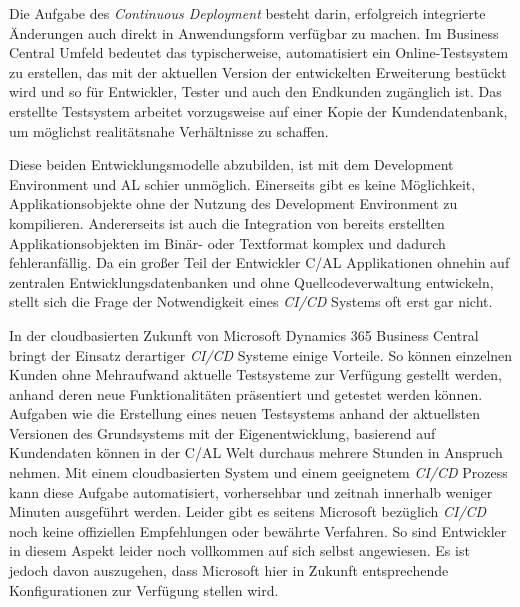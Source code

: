 Die Aufgabe des \textit{Continuous Deployment} besteht darin, erfolgreich integrierte Änderungen auch direkt in Anwendungsform verfügbar zu machen. Im Business Central Umfeld bedeutet das typischerweise, automatisiert ein Online-Testsystem zu erstellen, das mit der aktuellen Version der entwickelten Erweiterung bestückt wird und so für Entwickler, Tester und auch den Endkunden zugänglich ist. Das erstellte Testsystem arbeitet vorzugsweise auf einer Kopie der Kundendatenbank, um möglichst realitätsnahe Verhältnisse zu schaffen.

Diese beiden Entwicklungsmodelle abzubilden, ist mit dem Development Environment und AL schier unmöglich. Einerseits gibt es keine Möglichkeit, Applikationsobjekte ohne der Nutzung des Development Environment zu kompilieren. Andererseits ist auch die Integration von bereits erstellten Applikationsobjekten im Binär- oder Textformat komplex und dadurch fehleranfällig. Da ein großer Teil der Entwickler C/AL Applikationen ohnehin auf zentralen Entwicklungsdatenbanken und ohne Quellcodeverwaltung entwickeln, stellt sich die Frage der Notwendigkeit eines \textit{CI/CD} Systems oft erst gar nicht. 

In der cloudbasierten Zukunft von Microsoft Dynamics 365 Business Central bringt der Einsatz derartiger \textit{CI/CD} Systeme einige Vorteile. So können einzelnen Kunden ohne Mehraufwand aktuelle Testsysteme zur Verfügung gestellt werden, anhand deren neue Funktionalitäten präsentiert und getestet werden können. Aufgaben wie die Erstellung eines neuen Testsystems anhand der aktuellsten Versionen des Grundsystems mit der Eigenentwicklung, basierend auf Kundendaten können in der C/AL Welt durchaus mehrere Stunden in Anspruch nehmen. Mit einem cloudbasierten System und einem geeignetem \textit{CI/CD} Prozess kann diese Aufgabe automatisiert, vorhersehbar und zeitnah innerhalb weniger Minuten ausgeführt werden. Leider gibt es seitens Microsoft bezüglich \textit{CI/CD} noch keine offiziellen Empfehlungen oder bewährte Verfahren. So sind Entwickler in diesem Aspekt leider noch vollkommen auf sich selbst angewiesen. Es ist jedoch davon auszugehen, dass Microsoft hier in Zukunft entsprechende Konfigurationen zur Verfügung stellen wird. 




